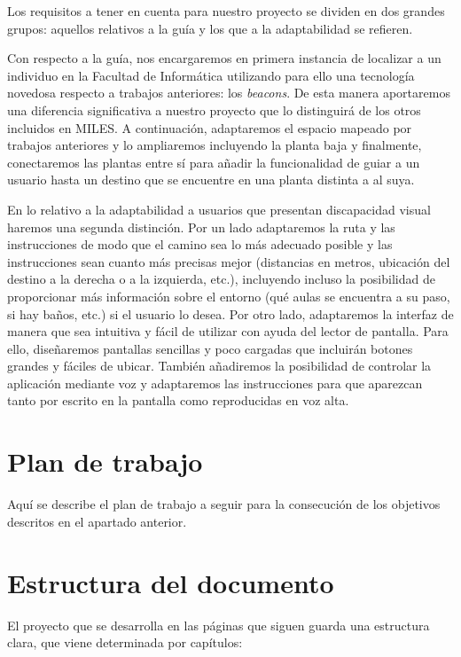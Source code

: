 Los requisitos a tener en cuenta para nuestro proyecto se dividen en dos grandes grupos: aquellos relativos a la guía y los que a la adaptabilidad se refieren.

Con respecto a la guía, nos encargaremos en primera instancia de localizar a un individuo en la Facultad de Informática utilizando para ello una tecnología novedosa respecto a trabajos anteriores: los \textit{beacons}. De esta manera aportaremos una diferencia significativa a nuestro proyecto que lo distinguirá de los otros incluidos en MILES. A continuación, adaptaremos el espacio mapeado por trabajos anteriores y lo ampliaremos incluyendo la planta baja y finalmente, conectaremos las plantas entre sí para añadir la funcionalidad de guiar a un usuario hasta un destino que se encuentre en una planta distinta a al suya.

En lo relativo a la adaptabilidad a usuarios que presentan discapacidad visual haremos una segunda distinción. Por un lado adaptaremos la ruta y las instrucciones de modo que el camino sea lo más adecuado posible y las instrucciones sean cuanto más precisas mejor (distancias en metros, ubicación del destino a la derecha o a la izquierda, etc.), incluyendo incluso la posibilidad de proporcionar más información sobre el entorno (qué aulas se encuentra a su paso, si hay baños, etc.) si el usuario lo desea. Por otro lado, adaptaremos la interfaz de manera que sea intuitiva y fácil de utilizar con ayuda del lector de pantalla. Para ello, diseñaremos pantallas sencillas y poco cargadas que incluirán botones grandes y fáciles de ubicar. También añadiremos la posibilidad de controlar la aplicación mediante voz y adaptaremos las instrucciones para que aparezcan tanto por escrito en la pantalla como reproducidas en voz alta.

\section{Plan de trabajo}
\label{sec:planTrabajo}
Aquí se describe el plan de trabajo a seguir para la consecución de los objetivos descritos en el apartado anterior.



\section{Estructura del documento}

El proyecto que se desarrolla en las páginas que siguen guarda una estructura clara, que viene determinada por capítulos:

